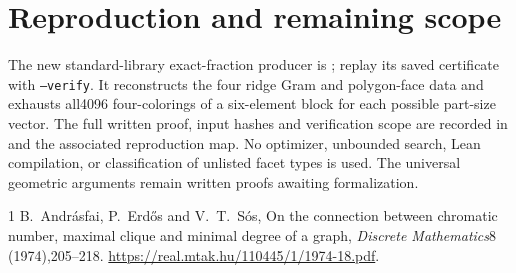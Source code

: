 \documentclass[11pt]{article}
\begin{document}
\section{Reproduction and remaining scope}
The new standard-library exact-fraction producer is
; replay its
saved certificate with \texttt{--verify}. It reconstructs the four
ridge Gram and polygon-face data and exhausts all4096 four-colorings
of a six-element block for each possible part-size vector. The full
written proof, input hashes and verification scope are recorded in
 and the associated
reproduction map. No optimizer, unbounded search, Lean compilation,
or classification of unlisted facet types is used. The universal
geometric arguments remain written proofs awaiting formalization.

\begin{thebibliography}{1}
 B.~Andr\'asfai, P.~Erd\H{o}s and V.~T.~S\'os,
On the connection between chromatic number, maximal clique and minimal
degree of a graph, \emph{Discrete Mathematics}8 (1974),205--218.
\url{https://real.mtak.hu/110445/1/1974-18.pdf}.
\end{thebibliography}
\end{document}
